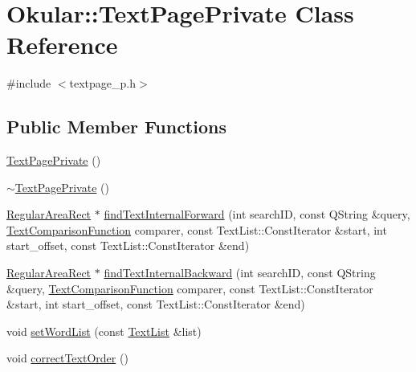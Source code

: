 \hypertarget{classOkular_1_1TextPagePrivate}{\section{Okular\+:\+:Text\+Page\+Private Class Reference}
\label{classOkular_1_1TextPagePrivate}
}


{\ttfamily \#include $<$textpage\+\_\+p.\+h$>$}

\subsection*{Public Member Functions}
\begin{DoxyCompactItemize}
\item 
\hyperlink{classOkular_1_1TextPagePrivate_a15d6902c7f5a8e0ad81bbe0669652560}{Text\+Page\+Private} ()
\item 
\hyperlink{classOkular_1_1TextPagePrivate_a0b7d7f78bd5fd09228899c4cfa551c86}{$\sim$\+Text\+Page\+Private} ()
\item 
\hyperlink{classOkular_1_1RegularAreaRect}{Regular\+Area\+Rect} $\ast$ \hyperlink{classOkular_1_1TextPagePrivate_aea4416c7f6f5b3fb791a357e2990345c}{find\+Text\+Internal\+Forward} (int search\+I\+D, const Q\+String \&query, \hyperlink{namespaceOkular_a686d56fd67c1b405491328f3f187a4b0}{Text\+Comparison\+Function} comparer, const Text\+List\+::\+Const\+Iterator \&start, int start\+\_\+offset, const Text\+List\+::\+Const\+Iterator \&end)
\item 
\hyperlink{classOkular_1_1RegularAreaRect}{Regular\+Area\+Rect} $\ast$ \hyperlink{classOkular_1_1TextPagePrivate_a720203a7151be15af3c70050eb9324c2}{find\+Text\+Internal\+Backward} (int search\+I\+D, const Q\+String \&query, \hyperlink{namespaceOkular_a686d56fd67c1b405491328f3f187a4b0}{Text\+Comparison\+Function} comparer, const Text\+List\+::\+Const\+Iterator \&start, int start\+\_\+offset, const Text\+List\+::\+Const\+Iterator \&end)
\item 
void \hyperlink{classOkular_1_1TextPagePrivate_a1cacd06d910c0e31834b22bb5a5a1916}{set\+Word\+List} (const \hyperlink{namespaceOkular_ae9075ed4d543c119d2e86fae7fc6cf46}{Text\+List} \&list)
\item 
void \hyperlink{classOkular_1_1TextPagePrivate_afccad0af04791e12ac8e1cbe4dd64811}{correct\+Text\+Order} ()
\end{DoxyCompactItemize}
